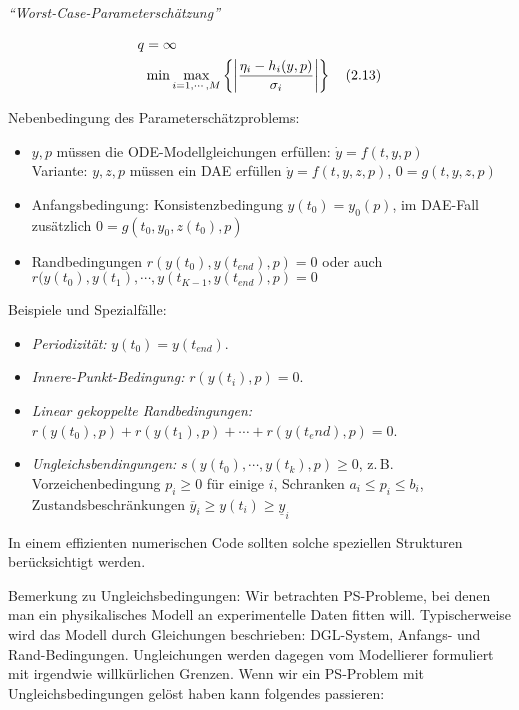 \emph{"`Worst-Case-Parameterschätzung"'}

\begin{align*}
q &= \infty \\
& \min \max_{i=1,\cdots,M} \left\{ \left| \frac{\eta_i-h_i(y,p)}{\sigma_i} \right| \right\} \quad (2.13)
\end{align*}

Nebenbedingung des Parameterschätzproblems:

\begin{itemize}
\item $y,p$ müssen die ODE-Modellgleichungen erfüllen: $\dot y = f(t,y,p)$ \\
Variante: $y,z,p$ müssen ein DAE erfüllen $\dot y = f(t,y,z,p)$, $0=g(t,y,z,p)$
\item Anfangsbedingung: Konsistenzbedingung $y(t_0) = y_0(p)$, im DAE-Fall zusätzlich $0=g(t_0,y_0,z(t_0),p)$
\item Randbedingungen $r(y(t_0),y(t_{end}),p) = 0$ oder auch $r(y(t_0),y(t_1),\cdots,y(t_{K-1}, y(t_{end}),p) = 0$
\end{itemize}


Beispiele und Spezialfälle:

\begin{itemize}
\item \emph{Periodizität:} $y(t_0) = y(t_{end})$.
\item \emph{Innere-Punkt-Bedingung:} $r(y(t_i),p) = 0$.
\item \emph{Linear gekoppelte Randbedingungen:} $r(y(t_0),p) + r(y(t_1),p) + \cdots + r(y(t_end),p) = 0$.
\item \emph{Ungleichsbendingungen:} $s(y(t_0), \cdots, y(t_k), p) \geq 0$, z.\,B. Vorzeichenbedingung $p_i \geq 0$ für einige $i$, Schranken $a_i \leq p_i \leq b_i$, Zustandsbeschränkungen $\overline y_i \geq y(t_i) \geq \underline y_i$
\end{itemize}

In einem effizienten numerischen Code sollten solche speziellen Strukturen berücksichtigt werden.



Bemerkung zu Ungleichsbedingungen: Wir betrachten PS-Probleme, bei denen man ein physikalisches Modell an experimentelle Daten fitten will. Typischerweise wird das Modell durch Gleichungen beschrieben: DGL-System, Anfangs- und Rand-Bedingungen. Ungleichungen werden dagegen vom Modellierer formuliert mit irgendwie willkürlichen Grenzen. Wenn wir ein PS-Problem mit Ungleichsbedingungen gelöst haben kann folgendes passieren:

